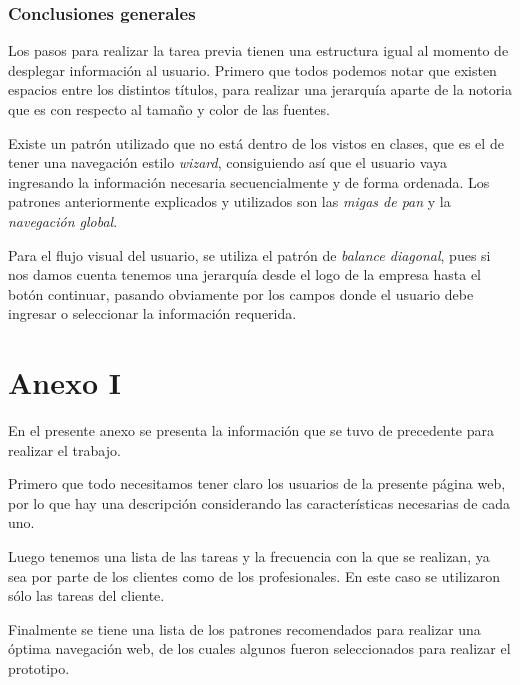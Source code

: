 \documentclass[letter, 10pt]{article}
\begin{document}
\subsubsection{Conclusiones generales}
Los pasos para realizar la tarea previa tienen una estructura igual al momento de desplegar información al usuario.
Primero que todos podemos notar que existen espacios entre los distintos títulos, para realizar una jerarquía aparte de la notoria
que es con respecto al tamaño y color de las fuentes.

Existe un patrón utilizado que no está dentro de los vistos en clases, que es el de tener una navegación estilo \emph{wizard}, consiguiendo así
que el usuario vaya ingresando la información necesaria secuencialmente y de forma ordenada. Los patrones anteriormente explicados y utilizados son
las \emph{migas de pan} y la \emph{navegación global}.

Para el flujo visual del usuario, se utiliza  el patrón de \emph{balance diagonal}, pues si nos damos cuenta tenemos una jerarquía desde el logo de la empresa
hasta el botón continuar, pasando obviamente por los campos donde el usuario debe ingresar o seleccionar la información requerida.


%
%
\newpage
\section{Anexo I}
\label{sec:anexo1}
En el presente anexo se presenta la información que se tuvo de precedente para realizar el trabajo.

Primero que todo necesitamos tener claro los usuarios de la presente página web, por lo que hay
una descripción considerando las características necesarias de cada uno.

Luego tenemos una lista de las tareas y la frecuencia con la que se realizan, ya sea por parte de los clientes
como de los profesionales. En este caso se utilizaron sólo las tareas del cliente.

Finalmente se tiene una lista de los patrones recomendados para realizar una óptima navegación web,
de los cuales algunos fueron seleccionados para realizar el prototipo.
\end{document}
